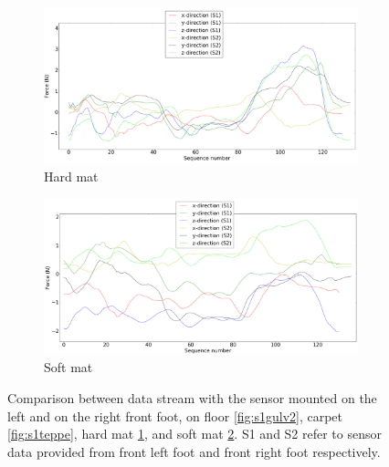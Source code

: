 \documentclass[USenglish]{ifimaster}  %
\begin{document}
	\begin{figure}[h] \ContinuedFloat
	
		\begin{subfigure}[h]{\textwidth}\ContinuedFloat
			\includegraphics[width=\textwidth,height=\textheight,keepaspectratio]{Figures/s1hardmatte}
			\caption{Hard mat}
			\label{fig:s1hardmatte}
		\end{subfigure}
		
		\begin{subfigure}[b]{\textwidth}
			\includegraphics[width=\textwidth,height=\textheight,keepaspectratio]{Figures/s1mykmatte}
			\caption{Soft mat}
			\label{fig:s1mykmatte}
		\end{subfigure}
		\caption[Comparision between data stream sensor mounted on left and right front foot of the robot]{Comparison between data stream with the sensor mounted on the left and on the right front foot, on floor \ref{fig:s1gulv2}, carpet \ref{fig:s1teppe}, hard mat \ref{fig:s1hardmatte}, and soft mat	\ref{fig:s1mykmatte}. S1 and S2 refer to sensor data provided from front left foot and front right foot respectively.}
		\label{fig:s1all}
	\end{figure}	
	\FloatBarrier
\end{document}
